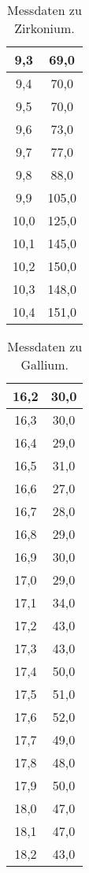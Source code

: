 \begin{table}
    \centering
    \caption{Messdaten zu Zirkonium.}
    \label{tab:Zirkonium}
    \begin{tabular}{c c}
        \toprule
         9,3 &  69,0 \\
        \midrule
         9,4 &  70,0 \\
         9,5 &  70,0 \\
         9,6 &  73,0 \\
         9,7 &  77,0 \\
         9,8 &  88,0 \\
         9,9 & 105,0 \\
        10,0 & 125,0 \\
        10,1 & 145,0 \\
        10,2 & 150,0 \\
        10,3 & 148,0 \\
        10,4 & 151,0 \\
        \bottomrule
    \end{tabular}
\end{table}

\begin{table}
    \centering
    \caption{Messdaten zu Gallium.}
    \label{tab:Gallium}
    \begin{tabular}{c c}
        \toprule
         16,2 &  30,0 \\
        \midrule
         16,3 &  30,0 \\
         16,4 &  29,0 \\
         16,5 &  31,0 \\
         16,6 &  27,0 \\
         16,7 &  28,0 \\
         16,8 &  29,0 \\
         16,9 &  30,0 \\
         17,0 &  29,0 \\
         17,1 &  34,0 \\
         17,2 &  43,0 \\
         17,3 &  43,0 \\
         17,4 &  50,0 \\
         17,5 &  51,0 \\
         17,6 &  52,0 \\
         17,7 &  49,0 \\
         17,8 &  48,0 \\
         17,9 &  50,0 \\
         18,0 &  47,0 \\
         18,1 &  47,0 \\
         18,2 &  43,0 \\
        \bottomrule
        \end{tabular}
\end{table}


